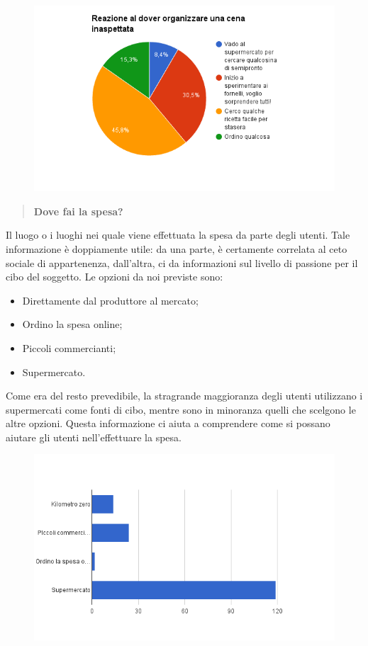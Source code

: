\begin{figure}[H]
	\centering
	\includegraphics[scale=0.6]{img/chart_reazione_cena}
\end{figure}

\begin{quote}
	\textbf{Dove fai la spesa?}
\end{quote}
Il luogo o i luoghi nei quale viene effettuata la spesa da parte degli utenti. Tale informazione è doppiamente utile: da una parte,
è certamente correlata al ceto sociale di appartenenza, dall'altra, ci da informazioni sul livello di passione per il cibo del soggetto.
Le opzioni da noi previste sono:
\begin{itemize}
 \item Direttamente dal produttore al mercato;
 \item Ordino la spesa online;
 \item Piccoli commercianti;
 \item Supermercato.
\end{itemize}
Come era del resto prevedibile, la stragrande maggioranza degli utenti utilizzano i supermercati come fonti di cibo, mentre sono in minoranza quelli che
scelgono le altre opzioni. Questa informazione ci aiuta a comprendere come si possano aiutare gli utenti nell'effettuare la spesa.

\begin{figure}[H]
	\centering
	\includegraphics[scale=0.6]{img/chart_dove_fai_la_spesa}
\end{figure}

